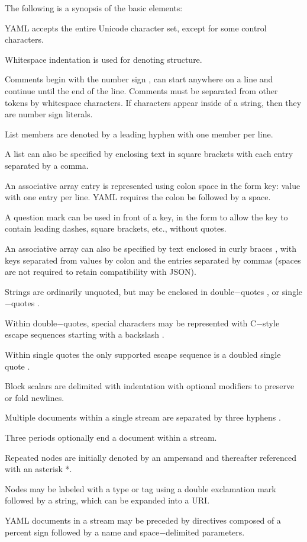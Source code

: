 The following is a synopsis of the basic elements:
\bit
\item YAML accepts the entire Unicode character set, except for some control characters.
\item Whitespace indentation is used for denoting structure.
\item Comments begin with the number sign \code{$\#$}, can start anywhere on a line and continue until the end of the
line. Comments must be separated from other tokens by whitespace characters. If \code{$\#$} characters appear inside
of a string, then they are number sign \code{$\#$} literals.
\item List members are denoted by a leading hyphen \code{$-$} with one member per line.
\item A list can also be specified by enclosing text in square brackets \code{[$\ldots$]} with each entry separated by a
comma.
\item An associative array entry is represented using colon space in the form key: value with one entry per line. YAML
requires the colon be followed by a space.
\item A question mark can be used in front of a key, in the form  to allow the key to contain leading
dashes, square brackets, etc., without quotes.
\item An associative array can also be specified by text enclosed in curly braces \code{$\{\ldots\}$}, with keys separated from
values by colon and the entries separated by commas (spaces are not required to retain compatibility with JSON).
\item Strings are ordinarily unquoted, but may be enclosed in double$-$quotes , or single$-$quotes .
\item Within double$-$quotes, special characters may be represented with C$-$style escape sequences starting with a
backslash \code{$\textbackslash$}.
\item Within single quotes the only supported escape sequence is a doubled single quote .
\item Block scalars are delimited with indentation with optional modifiers to preserve \code{|} or fold \code{>}
newlines.
\item Multiple documents within a single stream are separated by three hyphens \code{\texttt{$-${}$-${}$-$}}.
\item Three periods \code{$\ldots$} optionally end a document within a stream.
\item Repeated nodes are initially denoted by an ampersand \code{$\&$} and thereafter referenced with an asterisk *.
\item Nodes may be labeled with a type or tag using a double exclamation mark \code{!!} followed by a string, which can
be expanded into a URI.
\item YAML documents in a stream may be preceded by directives composed of a percent sign \code{$\%$} followed by a name
and space$-$delimited parameters.
\eit

